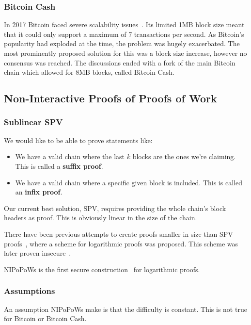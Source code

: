 \documentclass[11pt]{llncs}
\begin{document}
\subsubsection{Bitcoin Cash}
In 2017 Bitcoin faced severe scalability issues~\cite{onscaling}. Its limited
1MB block size meant that it could only support a maximum of 7 transactions per
second. As Bitcoin's popularity had exploded at the time, the problem was
hugely exacerbated. The most prominently proposed solution for this was a block
size increase, however no consensus was reached. The discussions ended with a
fork of the main Bitcoin chain which allowed for 8MB blocks, called Bitcoin
Cash.

\subsection{Non-Interactive Proofs of Proofs of Work}

\subsubsection{Sublinear SPV}
We would like to be able to prove statements like:

\begin{itemize}
  \item We have a valid chain where the last $k$ blocks are the ones we're
    claiming. This is called a \textbf{suffix proof}.
  \item We have a valid chain where a specific given block is included. This is
    called an \textbf{infix proof}.
\end{itemize}

Our current best solution, SPV, requires providing the whole chain's block
headers as proof. This is obviously linear in the size of the chain.

There have been previous attempts to create proofs smaller in size than SPV
proofs~\cite{KLS}, where a scheme for logarithmic proofs was proposed.
This scheme was later proven insecure~\cite{nipopows}.

NIPoPoWs is the first secure construction~\cite{nipopows} for logarithmic
proofs.

\subsubsection{Assumptions}
An assumption NIPoPoWs make is that the difficulty is constant. This is not
true for Bitcoin or Bitcoin Cash.
\end{document}
